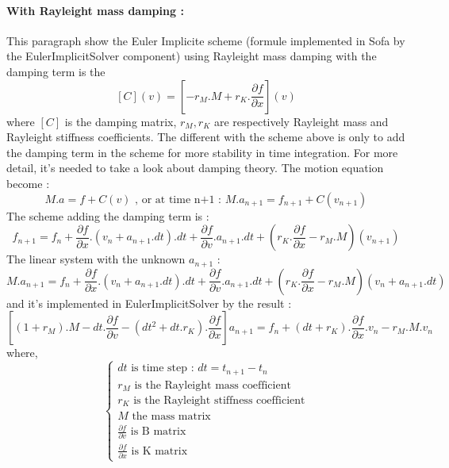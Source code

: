 \documentclass[a4paper,10pt]{article}
\begin{document}
\paragraph{With Rayleight mass damping :} This paragraph show the Euler Implicite scheme (formule implemented in Sofa by the EulerImplicitSolver component) using Rayleight mass damping with the damping term is the 
\[
[C](v) =[ -r_M.M + r_K.\frac{\partial f}{\partial x} ](v)
\]
where $[C]$ is the damping matrix, $r_M,r_K$ are respectively Rayleight mass and Rayleight stiffness coefficients. The different with the scheme above is only to add the damping term in the scheme for more stability in time integration. For more detail, it's needed to take a look about damping theory. The motion equation become :
 \[
M.a=f + C(v) \text{    ,  or at time n+1 :   }M.a_{n+1}=f_{n+1} + C(v_{n+1})
\]
The scheme adding the damping term is : 
\[
f_{n+1} = f_n + \frac{\partial f}{\partial x}.(v_{n}+a_{n+1}.dt).dt + \frac{\partial f}{\partial v}.a_{n+1}.dt  + (r_K.\frac{\partial f}{\partial x} - r_M.M)(v_{n+1})
\]
The linear system with the unknown $a_{n+1}$ :
\[
M.a_{n+1} = f_n + \frac{\partial f}{\partial x}.(v_{n}+a_{n+1}.dt).dt + \frac{\partial f}{\partial v}.a_{n+1}.dt   + (r_K.\frac{\partial f}{\partial x} - r_M.M)(v_{n}+a_{n+1}.dt)
\]
and it's implemented in EulerImplicitSolver by the result : 
\[
[(1+r_M).M  - dt.\frac{\partial f}{\partial v} - (dt^2+dt.r_K).\frac{\partial f}{\partial x}] a_{n+1} 
     = f_n + (dt + r_K).\frac{\partial f}{\partial x}.v_n - r_M.M.v_n
\]
where,
\[
\left\{ 
\begin{array}{l}
dt \text {  is time step :  } dt=t_{n+1}-t_{n} \\
r_M \text { is the Rayleight mass coefficient} \\
r_K \text { is the Rayleight stiffness coefficient} \\
M \text { the mass matrix} \\
\frac{\partial f}{\partial v} \text { is B matrix} \\
\frac{\partial f}{\partial x} \text { is K matrix} 
\end{array}\right.
\]
\end{document}
